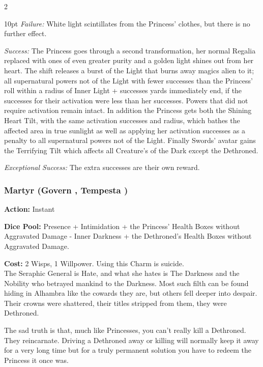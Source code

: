 \begin{multicols}{2}
\begin{myindentpar}{10pt}
    \emph{Failure:} White light scintillates from the Princess' clothes, but there is no further effect.

    \emph{Success:} The Princess goes through a second transformation, her normal Regalia replaced with ones of even greater purity and a golden light shines out from her heart. The shift releases a burst of the Light that burns away magics alien to it; all supernatural powers not of the Light with fewer successes than the Princess' roll within a radius of Inner Light + successes yards immediately end, if the successes for their activation were less than her successes. Powers that did not require activation remain intact. In addition the Princess gets both the Shining Heart Tilt, with the same activation successes and radius, which bathes the affected area in true sunlight as well as applying her activation successes as a penalty to all supernatural powers not of the Light. Finally Swords' avatar gains the Terrifying Tilt which affects all Creature's of the Dark except the Dethroned.  

    \emph{Exceptional Success:} The extra successes are their own reward.\end{myindentpar} 
    
\subsubsection*{Martyr (Govern \textbullet\textbullet\textbullet\textbullet\textbullet, Tempesta \textbullet\textbullet\textbullet\textbullet)}

\noindent \textbf{Action:} Instant

\noindent \textbf{Dice Pool:} Presence + Intimidation + the Princess' Health Boxes without Aggravated Damage - Inner Darkness + the Dethroned's Health Boxes without Aggravated Damage.

\noindent \textbf{Cost:} 2 Wisps, 1 Willpower. Using this Charm is suicide. \\

\noindent The Seraphic General is Hate, and what she hates is The Darkness and the Nobility who betrayed mankind to the Darkness. Most such filth can be found hiding in Alhambra like the cowards they are, but others fell deeper into despair. Their crowns were shattered, their titles stripped from them, they were Dethroned. 

The sad truth is that, much like Princesses, you can't really kill a Dethroned. They reincarnate. Driving a Dethroned away or killing will normally keep it away for a very long time but for a truly permanent solution you have to redeem the Princess it once was. 


\end{multicols}
